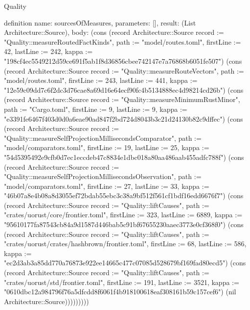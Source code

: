 \begin{lexlean}{Quality}
\begin{semanticmodule}
definition{
  name: sourcesOfMeasures,
  parameters: [],
  result: (List Architecture::Source),
  body: (cons (record Architecture::Source {record := "Quality::measureRoutedFactKinds", path := "model/routes.toml", firstLine := 42, lastLine := 242, kappa := "198cf4ec5549212d59ce691f5ab1f8d36856cbee742147e7a76868b6051fe507"}) (cons (record Architecture::Source {record := "Quality::measureRouteVectors", path := "model/routes.toml", firstLine := 243, lastLine := 441, kappa := "12e59c09dd7c6f2dc3d76cae8a69d16e64ecf90fc4b5134888ec4d98214cd26b"}) (cons (record Architecture::Source {record := "Quality::measureMinimumRustMinor", path := "Cargo.toml", firstLine := 9, lastLine := 9, kappa := "e3391fe6467f403d0d0a6eae90ad847f2bd724d8043b3c21d24130b82c9dffec"}) (cons (record Architecture::Source {record := "Quality::measureSelfProjectionMillisecondsComparator", path := "model/comparators.toml", firstLine := 19, lastLine := 25, kappa := "54d5395492e9cfb0d7ec1eccdeb47c8834e1dbc018a80aa486aab455adfc788f"}) (cons (record Architecture::Source {record := "Quality::measureSelfProjectionMillisecondsObservation", path := "model/comparators.toml", firstLine := 27, lastLine := 33, kappa := "46b07a8e4b08a8d3055ef72bdab55ebc3c38a9bf512f561cf1bdf16edd6676f7"}) (cons (record Architecture::Source {record := "Quality::liftCauses", path := "crates/uorust/core/frontier.toml", firstLine := 323, lastLine := 6889, kappa := "95610177fa87543cb84a9d1587d446bab5c91bf67655230aaec3773e0cf368f0"}) (cons (record Architecture::Source {record := "Quality::liftCauses", path := "crates/uorust/crates/hashbrown/frontier.toml", firstLine := 68, lastLine := 586, kappa := "ec2d3ab3a85dd770a76873e922ee14665c477c07085d528679bf169fad80ecd5"}) (cons (record Architecture::Source {record := "Quality::liftCauses", path := "crates/uorust/std/frontier.toml", firstLine := 191, lastLine := 3521, kappa := "0610dbc12a984796f76a5dfcdd8f6061f4b918100618eaf308161b59c157cef6"}) (nil Architecture::Source)))))))))
}
\end{semanticmodule}
\end{lexlean}

